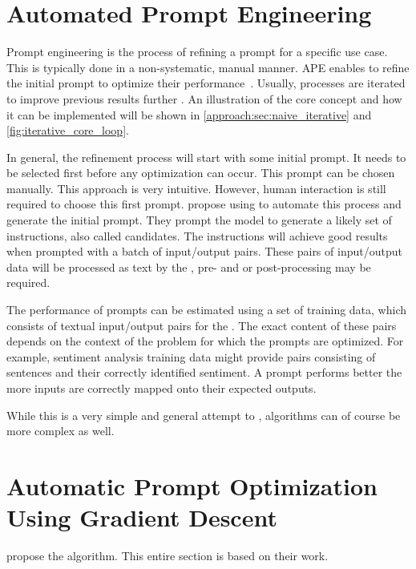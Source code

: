\section{Automated Prompt Engineering}
\label{sec:foundations:ape}
Prompt engineering is the process of refining a prompt for a specific use case.
This is typically done in a non-systematic, manual manner.
\Acl{APE} enables \LLMs to refine the initial prompt to optimize their performance~\cite{zadenoori2025AutomaticPrompt}.
Usually, \APE processes are iterated to improve previous results further \citeiterative.
An illustration of the core concept and how it can be implemented will be shown in \autoref{approach:sec:naive_iterative} and  \autoref{fig:iterative_core_loop}.

In general, the refinement process will start with some initial prompt.
It needs to be selected first before any optimization can occur.
This prompt can be chosen manually.
This approach is very intuitive.
However, human interaction is still required to choose this first prompt.
 propose using \LLMs to automate this process and generate the initial prompt.
They prompt the model to generate a likely set of instructions, also called candidates.
The instructions will achieve good results when prompted with a batch of input/output pairs.
These pairs of input/output data will be processed as text by the \LLM, pre- and or post-processing may be required.


The performance of prompts can be estimated using a set of training data, which consists of textual input/output pairs for the \LLM.
The exact content of these pairs depends on the context of the problem for which the prompts are optimized.
For example, sentiment analysis training data might provide pairs consisting of sentences and their correctly identified sentiment.
A prompt performs better the more inputs are correctly mapped onto their expected outputs.

While this is a very simple and general attempt to \APE, algorithms can of course be more complex as well.


\section{Automatic Prompt Optimization Using Gradient Descent}
\label{sec:gradient_descent}
 propose the \ProTeGi algorithm.
This entire section is based on their work.

